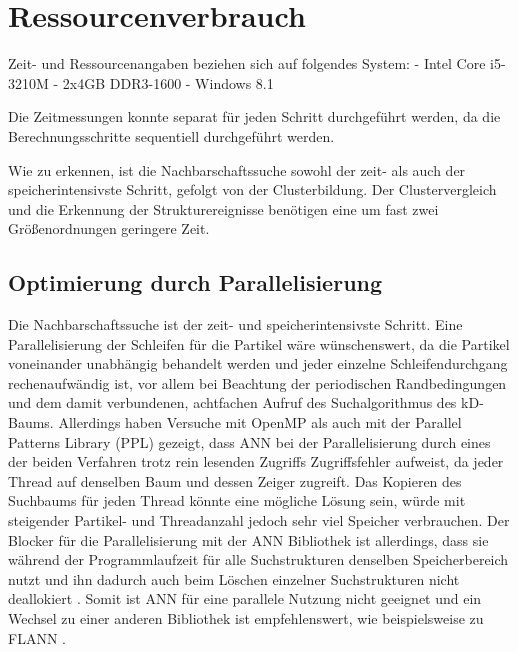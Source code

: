 
\section{Ressourcenverbrauch}

Zeit- und Ressourcenangaben beziehen sich auf folgendes System:
- Intel Core i5-3210M
- 2x4GB DDR3-1600
- Windows 8.1

Die Zeitmessungen konnte separat für jeden Schritt durchgeführt werden, da die Berechnungsschritte sequentiell durchgeführt werden.


Wie zu erkennen, ist die Nachbarschaftssuche sowohl der zeit- als auch der speicherintensivste Schritt, gefolgt von der Clusterbildung. Der Clustervergleich und die Erkennung der Strukturereignisse benötigen eine um fast zwei Größenordnungen geringere Zeit.


\subsection{Optimierung durch Parallelisierung}
Die Nachbarschaftssuche ist der zeit- und speicherintensivste Schritt. Eine Parallelisierung der Schleifen für die Partikel wäre wünschenswert, da die Partikel voneinander unabhängig behandelt werden und jeder einzelne Schleifendurchgang rechenaufwändig ist, vor allem bei Beachtung der periodischen Randbedingungen und dem damit verbundenen, achtfachen Aufruf des Suchalgorithmus des kD-Baums. Allerdings haben Versuche mit OpenMP als auch mit der Parallel Patterns Library (PPL) gezeigt, dass ANN bei der Parallelisierung durch eines der beiden Verfahren trotz rein lesenden Zugriffs Zugriffsfehler aufweist, da jeder Thread auf denselben Baum und dessen Zeiger zugreift. Das Kopieren des Suchbaums für jeden Thread könnte eine mögliche Lösung sein, würde mit steigender Partikel- und Threadanzahl jedoch sehr viel Speicher verbrauchen. %
Der Blocker für die Parallelisierung mit der ANN Bibliothek ist allerdings, dass sie während der Programmlaufzeit für alle Suchstrukturen denselben Speicherbereich nutzt und ihn dadurch auch beim Löschen einzelner Suchstrukturen nicht deallokiert \cite[S.~8]{mount2010ann}. Somit ist ANN für eine parallele Nutzung nicht geeignet und ein Wechsel zu einer anderen Bibliothek ist empfehlenswert, wie beispielsweise zu FLANN \cite{ohara2013annAlgo} \cite{wijewardena2014annPerformance}.

